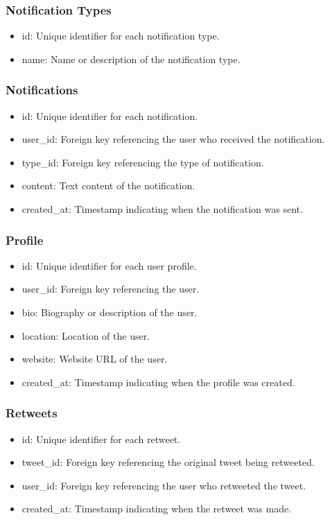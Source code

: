 \documentclass{article}
\begin{document}
\subsubsection{Notification Types}
\begin{itemize}
    \item id: Unique identifier for each notification type.
    \item name: Name or description of the notification type.
\end{itemize}

\subsubsection{Notifications}
\begin{itemize}
    \item id: Unique identifier for each notification.
    \item user\_id: Foreign key referencing the user who received the notification.
    \item type\_id: Foreign key referencing the type of notification.
    \item content: Text content of the notification.
    \item created\_at: Timestamp indicating when the notification was sent.
\end{itemize}

\subsubsection{Profile}
\begin{itemize}
    \item id: Unique identifier for each user profile.
    \item user\_id: Foreign key referencing the user.
    \item bio: Biography or description of the user.
    \item location: Location of the user.
    \item website: Website URL of the user.
    \item created\_at: Timestamp indicating when the profile was created.
\end{itemize}

\subsubsection{Retweets}
\begin{itemize}
    \item id: Unique identifier for each retweet.
    \item tweet\_id: Foreign key referencing the original tweet being retweeted.
    \item user\_id: Foreign key referencing the user who retweeted the tweet.
    \item created\_at: Timestamp indicating when the retweet was made.
\end{itemize}
\end{document}
